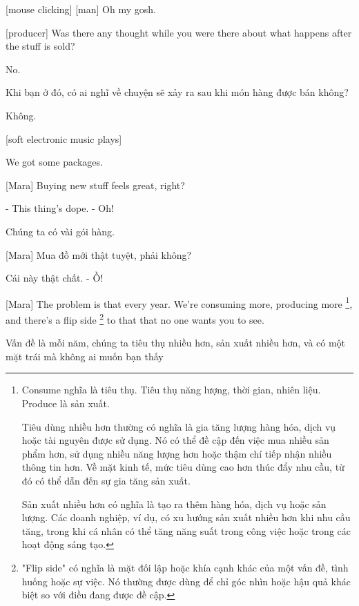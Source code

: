 \documentclass[a4paper]{article}
\begin{document}
	
	[mouse clicking] [man] Oh my gosh.
	
	[producer] Was there any thought while you were there about what happens after the stuff is sold?
	
	No.
	
	\begin{vietnamese-v2}
		Khi bạn ở đó, có ai nghĩ về chuyện sẽ xảy ra sau khi món hàng được bán không?
		
		Không.
	\end{vietnamese-v2}
	
	[soft electronic music plays]
	
	We got some packages.
	
	[Mara] Buying new stuff feels great, right?
	
	- This thing's dope. - Oh!
	
	\begin{vietnamese-v2}
		
		Chúng ta có vài gói hàng.
		
		[Mara] Mua đồ mới thật tuyệt, phải không?
		
		Cái này thật chất. - Ồ!
	\end{vietnamese-v2}
	
	[Mara] The problem is that every year. We're consuming more, producing more  \footnote{
		Consume nghĩa là tiêu thụ. Tiêu thụ năng lượng, thời gian, nhiên liệu. Produce là sản xuất.
		
		Tiêu dùng nhiều hơn thường có nghĩa là gia tăng lượng hàng hóa, dịch vụ hoặc tài nguyên được sử dụng. Nó có thể đề cập đến việc mua nhiều sản phẩm hơn, sử dụng nhiều năng lượng hơn hoặc thậm chí tiếp nhận nhiều thông tin hơn. Về mặt kinh tế, mức tiêu dùng cao hơn thúc đẩy nhu cầu, từ đó có thể dẫn đến sự gia tăng sản xuất.
		
		Sản xuất nhiều hơn có nghĩa là tạo ra thêm hàng hóa, dịch vụ hoặc sản lượng. Các doanh nghiệp, ví dụ, có xu hướng sản xuất nhiều hơn khi nhu cầu tăng, trong khi cá nhân có thể tăng năng suất trong công việc hoặc trong các hoạt động sáng tạo.
	}, and there's a flip side \footnote{
		"Flip side" có nghĩa là mặt đối lập hoặc khía cạnh khác của một vấn đề, tình huống hoặc sự việc. Nó thường được dùng để chỉ góc nhìn hoặc hậu quả khác biệt so với điều đang được đề cập.
		
	} to that that no one wants you to see.
	
	\begin{vietnamese-v2}
		[Mara] Vấn đề là mỗi năm, chúng ta tiêu thụ nhiều hơn, sản xuất nhiều hơn, và có một mặt trái mà không ai muốn bạn thấy
	\end{vietnamese-v2}
	
\end{document}
